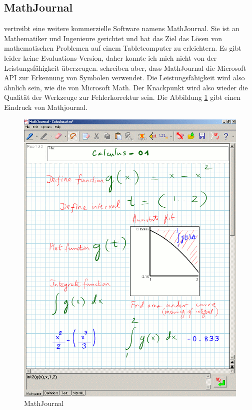 \subsection{MathJournal}

\citet{mathjournal} vertreibt eine weitere kommerzielle Software namens MathJournal. Sie ist an Mathematiker und Ingenieure gerichtet und hat das Ziel das Lösen von mathematischen Problemen auf einem Tabletcomputer zu erleichtern. Es gibt leider keine Evaluations-Version, daher konnte ich mich nicht von der Leistungsfähigkeit überzeugen. \citet{Tapia:2007p9160} schreiben aber, dass MathJournal die Microsoft API zur Erkennung von Symbolen verwendet. Die Leistungsfähigkeit wird also ähnlich sein, wie die von Microsoft Math. Der Knackpunkt wird also wieder die Qualität der Werkzeuge zur Fehlerkorrektur sein. Die Abbildung \ref{fig:mathjournal} gibt einen Eindruck von Mathjournal.

\begin{figure}[htbp]
  \begin{center}
    \includegraphics[width=.9\textwidth]{figures/mathjournal.png}
  \end{center}
  \caption{MathJournal}
  \label{fig:mathjournal}
\end{figure}

